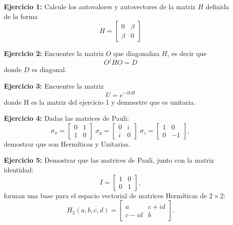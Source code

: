 \documentclass[a4paper,12pt]{article}
\begin{document}
\begin{enumerate}
    \item[\bf Ejercicio 1:] Calcule los autovalores y autovectores de la matriz $H$ definida
    de la forma
    \begin{equation}
        H = \begin{bmatrix}
            0 & \beta \\
            \beta & 0 
            \end{bmatrix}
    \end{equation}
    \item[\bf Ejercicio 2:] Encuentre la matriz $O$ que diagonaliza $H$, es decir que
    \begin{equation}
        O^\dagger H O = D
    \end{equation}
    donde $D$ es diagonal.
    \item[\bf Ejercicio 3:] Encuentre la matriz 
    \begin{equation}
        U = e^{-i\hbar H}
    \end{equation}
    donde H es la matriz del ejercicio 1 y demuestre que es unitaria.
    \item[\bf Ejercicio 4:] Dadas las matrices de Pauli:
    \begin{equation}
        \sigma_x = \begin{bmatrix}
            0 & 1 \\
            1 & 0 
            \end{bmatrix}\;
        \sigma_y = \begin{bmatrix}
            0 & i \\
            i & 0 
            \end{bmatrix}\;
        \sigma_z = \begin{bmatrix}
            1 & 0 \\
            0 & -1 
            \end{bmatrix},
    \end{equation} 
    demostrar que son Hermíticas y Unitarias.
    \item[\bf Ejercicio 5:] 
    Demostrar que las matrices de Pauli, junto con la matriz identidad:
    \begin{equation}
        I = \begin{bmatrix}
            1 & 0 \\
            0 & 1 
            \end{bmatrix},
    \end{equation}forman una base para el espacio vectorial de matrices Hermíticas de $2\times 2$:
    \begin{equation}
    H_2(a,b,c,d) = \begin{bmatrix}
        a & c+id \\
        c-id & b 
        \end{bmatrix}.
    \end{equation}

\end{enumerate}
\end{document}
